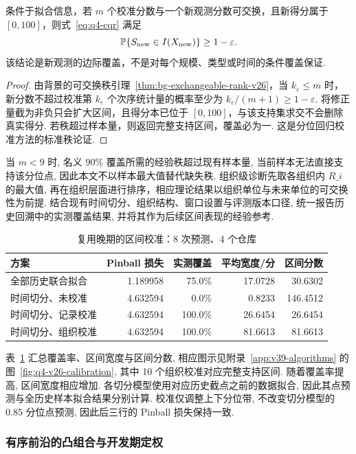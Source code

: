 \begin{proposition}[可交换条件下的有限样本边际覆盖]\label{thm:q4-cqr-conditional}
条件于拟合信息，若 $m$ 个校准分数与一个新观测分数可交换，且新得分属于 $[0,100]$，则式~\eqref{eq:q4-cqr} 满足
\[
\mathbb P\{S_{\rm new}\in I(X_{\rm new})\}\ge1-\varepsilon.
\]
该结论是新观测的边际覆盖，不是对每个规模、类型或时间的条件覆盖保证. 
\end{proposition}
\begin{proof}
由背景的可交换秩引理~\ref{thm:bg-exchangeable-rank-v26}，当 $k_\varepsilon\le m$ 时，新分数不超过校准第 $k_\varepsilon$ 个次序统计量的概率至少为 $k_\varepsilon/(m+1)\ge1-\varepsilon$. 将修正量截为非负只会扩大区间，且得分本已位于 $[0,100]$，与该支持集求交不会删除真实得分. 若秩超过样本量，则返回完整支持区间，覆盖必为一. 这是分位回归校准方法的标准秩论证\cite{romano_cqr}. 
\end{proof}
当 $m<9$ 时, 名义 $90\%$ 覆盖所需的经验秩超过现有样本量, 当前样本无法直接支持该分位点, 因此本文不以样本最大值替代缺失秩.  组织级诊断先取各组织内 $R\_i$ 的最大值, 再在组织层面进行排序，相应理论结果以组织单位与未来单位的可交换性为前提. 结合现有时间切分、组织结构、窗口设置与评测版本口径, 统一报告历史回溯中的实测覆盖结果, 并将其作为后续区间表现的经验参考.


\begin{table}[htbp]\centering\small
\caption{复用晚期的区间校准：8 次预测、4 个仓库}\label{tab:q4-v26-calibration}
\begin{tabular}{lrrrr}\toprule
方案 & Pinball 损失 & 实测覆盖 & 平均宽度/分 & 区间分数\\\midrule
全部历史联合拟合 & 1.189958 & 75.0\% & 17.0728 & 30.6302\\
时间切分、未校准 & 4.632594 & 0.0\% & 0.8233 & 146.4512\\
时间切分、记录校准 & 4.632594 & 100.0\% & 26.6454 & 26.6454\\
时间切分、组织校准 & 4.632594 & 100.0\% & 81.6613 & 81.6613\\\bottomrule
\end{tabular}\end{table}
表~\ref{tab:q4-v26-calibration} 汇总覆盖率、区间宽度与区间分数, 相应图示见附录~\ref{app:v39-algorithms} 的图~\ref{fig:q4-v26-calibration}, 其中 10 个组织校准对应完整支持区间. 随着覆盖率提高, 区间宽度相应增加. 各切分模型使用对应历史截点之前的数据拟合, 因此其点预测与全历史样本拟合结果分别计算. 校准仅调整上下分位带, 不改变切分模型的 $0.85$ 分位点预测, 因此后三行的 Pinball 损失保持一致.
\subsubsection{有序前沿的凸组合与开发期定权}

